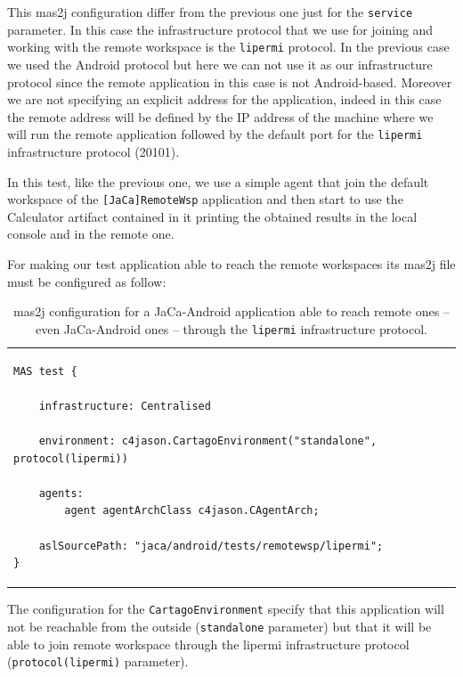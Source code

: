 \documentclass[11pt]{report}
\newcommand\labeltab[1]{\label{tb:#1}}
\newcommand\code[1]{{\mbox{\texttt{{#1}}}}}
\newcommand{\jaca}{\mbox{\sf{JaCa}}}
\newcommand{\cartago}{\mbox{\sf{CArtAgO}}}
\newcommand{\jacandroid}{\textsf{JaCa-Android}}
\begin{document}
This \textsf{mas2j} configuration differ from the previous one just for the \code{service} parameter. In this case the infrastructure protocol that we use for joining and working with the remote workspace is the \code{lipermi} protocol. In the previous case we used the Android protocol but here we can not use it as our infrastructure protocol since the remote application in this case is not Android-based. Moreover we are not specifying an explicit address for the application, indeed in this case the remote address will be defined by the IP address of the machine where we will run the remote application followed by the default port for the \cartago{} \code{lipermi} infrastructure protocol (20101).
%

In this test, like the previous one, we use a simple agent that join the default workspace of the \code{[JaCa]RemoteWsp} application and then start to use the \textsf{Calculator} artifact contained in it printing the obtained results in the local console and in the remote one. 

\noindent For making our test application able to reach the remote workspaces its \textsf{mas2j} file must be configured as follow:


\begin{table}[!h]
\begin{tabular} {p{10cm}}
\begin{minipage}{10cm}
{\scriptsize \begin{verbatim}
MAS test {
	
	infrastructure: Centralised

    environment: c4jason.CartagoEnvironment("standalone", protocol(lipermi)) 

    agents:  
   		agent agentArchClass c4jason.CAgentArch;

    aslSourcePath: "jaca/android/tests/remotewsp/lipermi";
}
\end{verbatim}}
\end{minipage}
\end{tabular}
\caption{\textsf{mas2j} configuration for a \jacandroid{} application able to reach remote \jaca{} ones -- even \jacandroid{} ones -- through the \code{lipermi} infrastructure protocol.}
    \labeltab{remote-join2}
\end{table}



The configuration for the \code{CartagoEnvironment} specify that this application will not be reachable from the outside (\code{standalone} parameter) but that it will be able to join remote workspace through the lipermi infrastructure protocol (\code{protocol(lipermi)} parameter).
\end{document}
